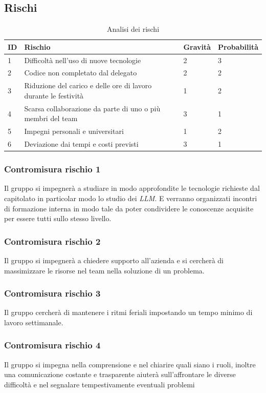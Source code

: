 \documentclass{article}
\begin{document}
\subsection{Rischi}
\begin{table}[h]
    \centering
    \begin{tabular}{|p{0.5cm}|p{7cm}|p{2cm}|p{2cm}|}
        \hline
        \textbf{ID} & \textbf{Rischio} & \textbf{Gravità} & \textbf{Probabilità} \\
        \hline
        1 & Difficoltà nell'uso di nuove tecnologie & 2 & 3 \\ 
        \hline
        2 & Codice non completato dal delegato & 2 & 2 \\ 
        \hline
        3 & Riduzione del carico e delle ore di lavoro durante le festività & 1 & 2 \\ 
        \hline 
        4 & Scarsa collaborazione da parte di uno o più membri del team & 3 & 1 \\ 
        \hline
        5 & Impegni personali e universitari & 1 & 2 \\ 
        \hline 
        6 & Deviazione dai tempi e costi previsti & 3 & 1 \\
        \hline
    \end{tabular}
    \caption{Analisi dei rischi}
    \label{tab:analisi_rischi}
\end{table}

\subsubsection{Contromisura rischio 1}
Il gruppo si impegnerà a studiare in modo approfondite le tecnologie richieste dal capitolato in particolar modo lo studio dei \emph{LLM}. E verranno organizzati incontri di formazione interna in modo tale da poter condividere le conoscenze acquisite per essere tutti sullo stesso livello.
\subsubsection{Contromisura rischio 2}
Il gruppo si impegnerà a chiedere supporto all'azienda e si cercherà di massimizzare le risorse nel team nella soluzione di un problema.
\subsubsection{Contromisura rischio 3}
Il gruppo cercherà di mantenere i ritmi feriali impostando un tempo minimo di lavoro settimanale.
\subsubsection{Contromisura rischio 4}
Il gruppo si impegna nella comprensione e nel chiarire quali siano i ruoli, inoltre una comunicazione costante e trasparente aiuterà sull'affrontare le diverse difficoltà e nel segnalare tempestivamente eventuali problemi
\end{document}
